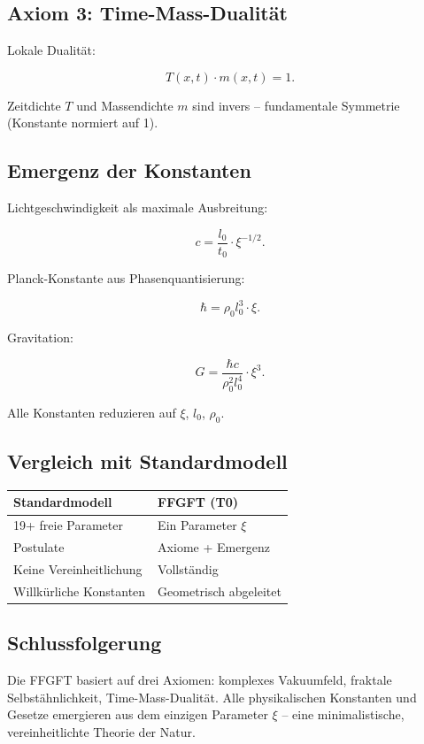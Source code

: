 	\subsection*{Axiom 3: Time-Mass-Dualität}
	
	Lokale Dualität:
	
	\begin{equation}
		T(x,t) \cdot m(x,t) = 1.
	\end{equation}
	
	Zeitdichte \(T\) und Massendichte \(m\) sind invers – fundamentale Symmetrie (Konstante normiert auf 1).
	
	\subsection*{Emergenz der Konstanten}
	
	Lichtgeschwindigkeit als maximale Ausbreitung:
	
	\begin{equation}
		c = \frac{l_0}{t_0} \cdot \xi^{-1/2}.
	\end{equation}
	
	Planck-Konstante aus Phasenquantisierung:
	
	\begin{equation}
		\hbar = \rho_0 l_0^3 \cdot \xi.
	\end{equation}
	
	Gravitation:
	
	\begin{equation}
		G = \frac{\hbar c}{\rho_0^2 l_0^4} \cdot \xi^3.
	\end{equation}
	
	Alle Konstanten reduzieren auf \(\xi\), \(l_0\), \(\rho_0\).
	
	\subsection*{Vergleich mit Standardmodell}
	
	\begin{center}
		\begin{tabular}{p{}p{}}
			\textbf{Standardmodell} & \textbf{FFGFT (T0)} \\
			\hline
			19+ freie Parameter & Ein Parameter \(\xi\) \\
			Postulate & Axiome + Emergenz \\
			Keine Vereinheitlichung & Vollständig \\
			Willkürliche Konstanten & Geometrisch abgeleitet \\
		\end{tabular}
	\end{center}
	
	\subsection*{Schlussfolgerung}
	
	Die FFGFT basiert auf drei Axiomen: komplexes Vakuumfeld, fraktale Selbstähnlichkeit, Time-Mass-Dualität. Alle physikalischen Konstanten und Gesetze emergieren aus dem einzigen Parameter \(\xi\) – eine minimalistische, vereinheitlichte Theorie der Natur.



